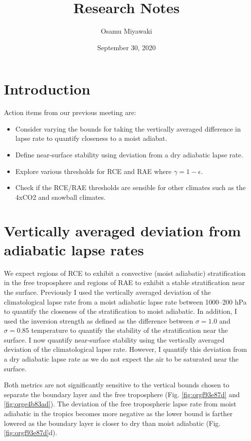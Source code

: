 \documentclass[11pt]{article}
\author{Osamu Miyawaki}
\date{September 30, 2020}
\title{Research Notes}
\begin{document}
\maketitle

\section{Introduction}
\label{sec:org78f0457}
Action items from our previous meeting are:
\begin{itemize}
\item Consider varying the bounds for taking the vertically averaged difference in lapse rate to quantify closeness to a moist adiabat.
\item Define near-surface stability using deviation from a dry adiabatic lapse rate.
\item Explore various thresholds for RCE and RAE where \(\gamma = 1-\epsilon\).
\item Check if the RCE/RAE thresholds are sensible for other climates such as the 4xCO2 and snowball climates.
\end{itemize}

\section{Vertically averaged deviation from adiabatic lapse rates}
\label{sec:org6678dda}
We expect regions of RCE to exhibit a convective (moist adiabatic) stratification in the free troposphere and regions of RAE to exhibit a stable stratification near the surface. Previously I used the vertically averaged deviation of the climatological lapse rate from a moist adiabatic lapse rate between 1000--200 hPa to quantify the closeness of the stratification to moist adiabatic. In addition, I used the inversion strength as defined as the difference between \(\sigma=1.0\) and \(\sigma=0.85\) temperature to quantify the stability of the stratification near the surface. I now quantify near-surface stability using the vertically averaged deviation of the climatological lapse rate. However, I quantify this deviation from a dry adiabatic lapse rate as we do not expect the air to be saturated near the surface.

Both metrics are not significantly sensitive to the vertical bounds chosen to separate the boundary layer and the free troposphere (Fig. \ref{fig:orgf93e87d} and \ref{fig:orge4b83ad}). The deviation of the free tropospheric lapse rate from moist adiabatic in the tropics becomes more negative as the lower bound is farther lowered as the boundary layer is closer to dry than moist adiabatic (Fig. \ref{fig:orgf93e87d}d).
\end{document}
